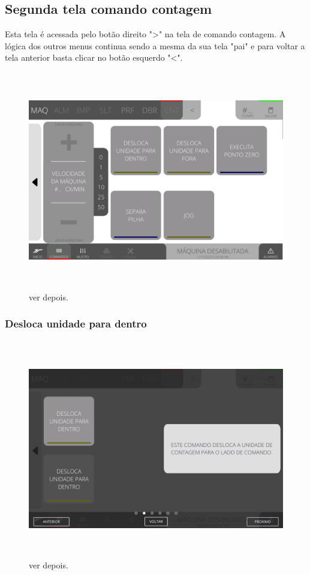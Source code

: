 \newpage
\thispagestyle{fancy}
\vspace*{\fill}
\subsection{Segunda tela comando contagem}
Esta tela é acessada pelo botão direito "\textgreater" na tela de comando contagem. A lógica dos outros menus continua sendo a mesma da sua tela "pai" e para voltar a tela anterior basta clicar no botão esquerdo "\textless{}".
\begin{figure}[h]
  \centering
  \includegraphics[width=576px,height=360px]{src/imagesFlexo/08-count/commands/e-Tela-Principal-2.png}
  \caption{ver depois.}
   \label{}
\end{figure}

\newpage
\thispagestyle{fancy}
\vspace*{\fill}
\subsubsection{\small{Desloca unidade para dentro}}
\begin{figure}[h]
  \centering
  \includegraphics[width=576px,height=360px]{src/imagesFlexo/08-count/commands/e-9.png}
  \caption{ver depois.}
   \label{}
\end{figure}
\vspace*{\fill}

